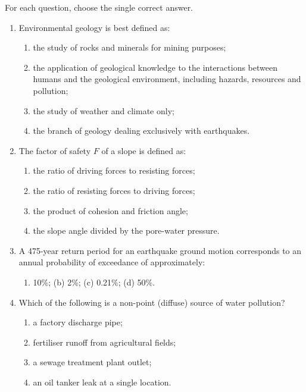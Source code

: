 \documentclass[11pt]{article}
\begin{document}
\begin{exercice}
For each question, choose the single correct answer.
\begin{enumerate}
\item Environmental geology is best defined as:
\begin{enumerate}
\item the study of rocks and minerals for mining purposes;
\item the application of geological knowledge to the interactions between humans and the geological environment, including hazards, resources and pollution;
\item the study of weather and climate only;
\item the branch of geology dealing exclusively with earthquakes.
\end{enumerate}
\item The factor of safety $F$ of a slope is defined as:
\begin{enumerate}
\item the ratio of driving forces to resisting forces;
\item the ratio of resisting forces to driving forces;
\item the product of cohesion and friction angle;
\item the slope angle divided by the pore-water pressure.
\end{enumerate}
\item A 475-year return period for an earthquake ground motion corresponds to an annual probability of exceedance of approximately:
\begin{enumerate}
\item 10\%; \quad (b) 2\%; \quad (c) 0.21\%; \quad (d) 50\%.
\end{enumerate}
\item Which of the following is a non-point (diffuse) source of water pollution?
\begin{enumerate}
\item a factory discharge pipe;
\item fertiliser runoff from agricultural fields;
\item a sewage treatment plant outlet;
\item an oil tanker leak at a single location.
\end{enumerate}
\end{enumerate}
\end{exercice}
\end{document}
